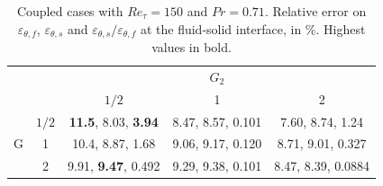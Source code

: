 \documentclass{svjour3}                     %
\begin{document}
\begin{table}
\centering
\caption{
Coupled cases with $Re_\tau = 150$ and $Pr = 0.71$.
Relative error on $\varepsilon_{\theta,f}$, $\varepsilon_{\theta,s}$ and $\varepsilon_{\theta,s}/\varepsilon_{\theta,f}$ at the fluid-solid interface, in \%.
Highest values in bold.
}
\label{tab-valid_150_cosphi}
\begin{tabular}{ccccc}
 & & & $G_2$ & \\
 & & $1/2$ & 1 & 2 \\
 & $1/2$ & \textbf{11.5}, 8.03, \textbf{3.94} & 8.47, 8.57, 0.101 & 7.60, 8.74, 1.24  \\
G & 1    & 10.4, 8.87, 1.68 & 9.06, 9.17, 0.120 & 8.71, 9.01, 0.327  \\
 & 2     & 9.91, \textbf{9.47}, 0.492 & 9.29, 9.38, 0.101 & 8.47, 8.39, 0.0884  \\
\end{tabular}
\end{table}
\end{document}
